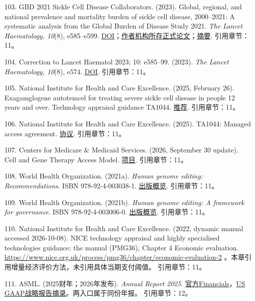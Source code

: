 \documentclass[UTF8,fontset=windows,12pt,a4paper,oneside,openany]{ctexbook}
\begin{document}
103. GBD 2021 Sickle Cell Disease Collaborators. (2023). Global, regional, and national prevalence and mortality burden of sickle cell disease, 2000–2021: A systematic analysis from the Global Burden of Disease Study 2021. \emph{The Lancet Haematology, 10}(8), e585–e599. \href{https://doi.org/10.1016/S2352-3026(23)00118-7}{DOI}；\href{https://repository.up.ac.za/server/api/core/bitstreams/fd57c857-9ec2-4897-b38c-ff955abb4bb0/content}{作者机构所存正式论文}；\href{https://pubmed.ncbi.nlm.nih.gov/37331373/}{摘要}.
引用章节：11。

104. Correction to Lancet Haematol 2023; 10: e585–99. (2023). \emph{The Lancet Haematology, 10}(8), e574. \href{https://doi.org/10.1016/S2352-3026(23)00215-6}{DOI}.
引用章节：11。

105. National Institute for Health and Care Excellence. (2025, February 26). Exagamglogene autotemcel for treating severe sickle cell disease in people 12 years and over. Technology appraisal guidance TA1044. \href{https://www.nice.org.uk/guidance/ta1044/chapter/1-recommendations}{推荐}.
引用章节：11。

106. National Institute for Health and Care Excellence. (2025). TA1044: Managed access agreement. \href{https://www.nice.org.uk/guidance/ta1044/resources/managed-access-agreement-pdf-15250968973}{协议}.
引用章节：11。

107. Centers for Medicare \& Medicaid Services. (2026, September 30 update). Cell and Gene Therapy Access Model. \href{https://www.cms.gov/priorities/innovation/innovation-models/cgt}{项目}.
引用章节：11。

108. World Health Organization. (2021a). \emph{Human genome editing: Recommendations}. ISBN 978-92-4-003038-1. \href{https://www.who.int/publications/i/item/9789240030381}{出版概览}.
引用章节：11。

109. World Health Organization. (2021b). \emph{Human genome editing: A framework for governance}. ISBN 978-92-4-003006-0. \href{https://www.who.int/publications/i/item/9789240030060}{出版概览}.
引用章节：11。

110. National Institute for Health and Care Excellence. (2022, dynamic manual accessed 2026-10-08). NICE technology appraisal and highly specialised technologies guidance: the manual (PMG36), Chapter 4 Economic evaluation. \url{https://www.nice.org.uk/process/pmg36/chapter/economic-evaluation-2} 。本章引用增量经济评价方法，未引用具体当期支付阈值。
引用章节：11。

111. ASML. (2025财年；2026年发布). \emph{Annual Report 2025}. \href{https://www.asml.com/investors/annual-report/2025/financials}{官方Financials}，\href{https://ourbrand.asml.com/m/8ab959d4926657b/original/asml-2025-annual-report-strategic-report-section.pdf}{US GAAP战略报告摘录}。两入口属于同份年报。
引用章节：12。
\end{document}
